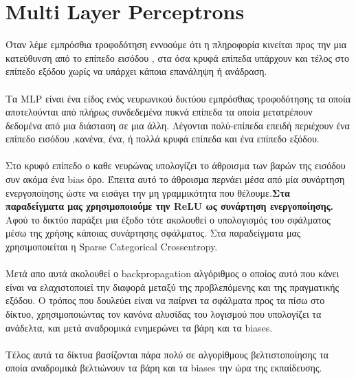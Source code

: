 \documentclass[11pt, letterpaper]{article}
\begin{document}
\section*{Multi Layer Perceptrons}
Όταν λέμε εμπρόσθια τροφοδότηση εννοούμε ότι η πληροφορία κινείται προς την μια κατεύθυνση από το επίπεδο εισόδου , στα όσα κρυφά επίπεδα υπάρχουν και τέλος στο επίπεδο εξόδου χωρίς να 
υπάρχει κάποια επανάληψη ή ανάδραση. \\ \\
Τα MLP είναι ένα είδος ενός νευρωνικού δικτύου εμπρόσθιας τροφοδότησης τα οποία αποτελούνται από πλήρως συνδεδεμένα πυκνά επίπεδα τα οποία μετατρέπουν δεδομένα από μια διάσταση σε μια άλλη.
Λέγονται πολύ-επίπεδα επειδή περιέχουν ένα επίπεδο εισόδου ,κανένα, ένα, ή πολλά κρυφά επίπεδα και ένα επίπεδο εξόδου. \\ \\
Στο κρυφό επίπεδο ο καθε νευρώνας υπολογίζει το άθροισμα των βαρών της εισόδου συν ακόμα ένα bias όρο. Έπειτα αυτό το άθροισμα περνάει μέσα από μία συνάρτηση ενεργοποίησης ώστε να εισάγει την μη 
γραμμικότητα που θέλουμε.\textbf{Στα παραδείγματα μας χρησιμοποιούμε την ReLU ως συνάρτηση ενεργοποίησης.}
Αφού το δικτύο παράξει μια έξοδο τότε ακολουθεί ο υπολογισμός του σφάλματος μέσω της χρήσης κάποιας συνάρτησης σφάλματος.
Στα παραδείγματα μας  χρησιμοποιείται η Sparse Categorical Crossentropy. \\ \\
Μετά απο αυτά ακολουθεί ο backpropagation αλγόριθμος ο οποίος αυτό που κάνει είναι να ελαχιστοποιεί την διαφορά μεταξύ της προβλεπόμενης και της πραγματικής εξόδου. Ο τρόπος που δουλεύει
είναι να παίρνει τα σφάλματα προς τα πίσω στο δίκτυο, χρησιμοποιώντας τον κανόνα αλυσίδας του λογισμού που υπολογίζει τα ανάδελτα, και μετά αναδρομικά ενημερώνει τα βάρη και τα biases. \\ \\
Τέλος αυτά τα δίκτυα βασίζονται πάρα πολύ σε αλγορίθμους βελτιστοποίησης τα οποία αναδρομικά βελτιώνουν τα βάρη και τα biases την ώρα της εκπαίδευσης.

\newpage
\end{document}

